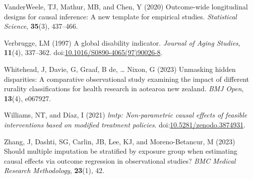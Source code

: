 \documentclass[
  single column]{article}
\newlength{\cslhangindent}
\newenvironment{CSLReferences}[2] %
 {\begin{list}{}{%
  \setlength{\itemindent}{0pt}
  \setlength{\leftmargin}{0pt}
  \setlength{\parsep}{0pt}
  \ifodd #1
   \setlength{\leftmargin}{\cslhangindent}
   \setlength{\itemindent}{-1\cslhangindent}
  \fi
  \setlength{\itemsep}{#2\baselineskip}}}
 {\end{list}}
\begin{document}
\begin{CSLReferences}{1}{0}
VanderWeele, TJ, Mathur, MB, and Chen, Y (2020) Outcome-wide
longitudinal designs for causal inference: A new template for empirical
studies. \emph{Statistical Science}, \textbf{35}(3), 437--466.

Verbrugge, LM (1997) A global disability indicator. \emph{Journal of
Aging Studies}, \textbf{11}(4), 337--362.
doi:\href{https://doi.org/10.1016/S0890-4065(97)90026-8}{10.1016/S0890-4065(97)90026-8}.

Whitehead, J, Davie, G, Graaf, B de, \ldots{} Nixon, G (2023) Unmasking
hidden disparities: A comparative observational study examining the
impact of different rurality classifications for health research in
aotearoa new zealand. \emph{BMJ Open}, \textbf{13}(4), e067927.

Williams, NT, and Díaz, I (2021) \emph{{l}mtp: Non-parametric causal
effects of feasible interventions based on modified treatment policies}.
doi:\href{https://doi.org/10.5281/zenodo.3874931}{10.5281/zenodo.3874931}.

Zhang, J, Dashti, SG, Carlin, JB, Lee, KJ, and Moreno-Betancur, M (2023)
Should multiple imputation be stratified by exposure group when
estimating causal effects via outcome regression in observational
studies? \emph{BMC Medical Research Methodology}, \textbf{23}(1), 42.

\end{CSLReferences}
\end{document}
